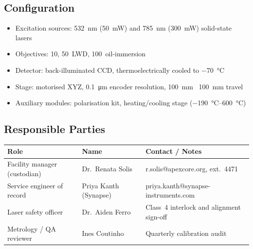 \subsection{Configuration}

\begin{itemize}[leftmargin=1.4em, itemsep=2pt]
  \item Excitation sources: 532~nm (50~mW) and 785~nm (300~mW) solid-state lasers
  \item Objectives: 10\texttimes, 50\texttimes\ LWD, 100\texttimes\ oil-immersion
  \item Detector: back-illuminated CCD, thermoelectrically cooled to \SI{-70}{\celsius}
  \item Stage: motorised XYZ, \SI{0.1}{\micro\meter} encoder resolution, 100~mm \texttimes\ 100~mm travel
  \item Auxiliary modules: polarisation kit, heating/cooling stage (\SIrange{-190}{600}{\celsius})
\end{itemize}

\subsection{Responsible Parties}

\begin{center}
\renewcommand{\arraystretch}{1.12}
\begin{tabularx}{\linewidth}{@{}l l X@{}}
\toprule
\rowcolor{slatePale}
\textbf{Role} & \textbf{Name} & \textbf{Contact / Notes} \\
\midrule
Facility manager (custodian) & Dr.\ Renata Solis & r.solis@apexcore.org, ext.\ 4471 \\
Service engineer of record & Priya Kanth (Synapse) & priya.kanth@synapse-instruments.com \\
Laser safety officer & Dr.\ Aiden Ferro & Class~4 interlock and alignment sign-off \\
Metrology / QA reviewer & Ines Coutinho & Quarterly calibration audit \\
\bottomrule
\end{tabularx}
\end{center}
